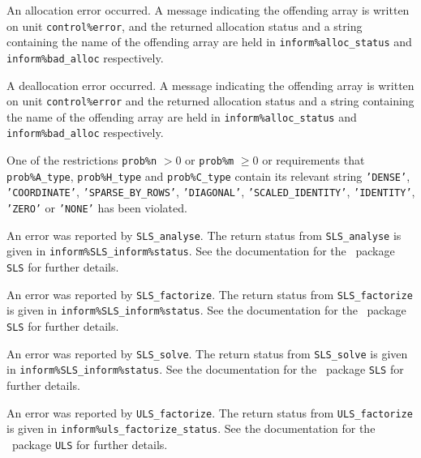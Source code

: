 \documentclass{galahad}
\begin{document}
\begin{description}

 An allocation error occurred.
A message indicating the offending
array is written on unit {\tt control\%error}, and the returned allocation
status and a string containing the name of the offending array
are held in {\tt inform\%alloc\_\-status}
and {\tt inform\%bad\_alloc} respectively.

 A deallocation error occurred.
A message indicating the offending
array is written on unit {\tt control\%error} and the returned allocation
status and a string containing the name of the offending array
are held in {\tt inform\%alloc\_\-status}
and {\tt inform\%bad\_alloc} respectively.

 One of the restrictions
   {\tt prob\%n} $> 0$ or {\tt prob\%m} $\geq  0$
    or requirements that {\tt prob\%A\_type}, {\tt prob\%H\_type} and
    {\tt prob\%C\_type} contain its relevant string
    {\tt 'DENSE'}, {\tt 'COORDINATE'}, {\tt 'SPARSE\_BY\_ROWS'},
    {\tt 'DIAGONAL'}, {\tt 'SCALED\_IDENTITY'}, {\tt 'IDENTITY'},
    {\tt 'ZERO'} or {\tt 'NONE'}
    has been violated.


 An error was reported by {\tt SLS\_analyse}. The return
status from {\tt SLS\_analyse} is given in
{\tt inform\%SLS\_inform\%status}.
See the documentation for the \galahad\ package {\tt SLS} for further details.

 An error was reported by {\tt SLS\_factorize}.
The return status from {\tt SLS\_factorize} is given in
{\tt inform\%SLS\_inform\%status}.
See the documentation for the \galahad\ package {\tt SLS} for further details.

 An error was reported by {\tt SLS\_solve}. The return
status from {\tt SLS\_solve} is given in {\tt inform\%SLS\_inform\%status}.
See the documentation for the \galahad\ package {\tt SLS} for further details.

 An error was reported by {\tt ULS\_factorize}.
The return status from {\tt ULS\_factorize} is given in
{\tt inform\%uls\_factorize\_\-status}.
See the documentation for the \galahad\ package {\tt ULS} for further details.


\end{description}
\end{document}
